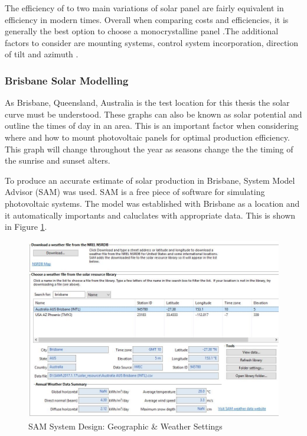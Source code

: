 The efficiency of to two main variations of solar panel are fairly equivalent in efficiency in modern times. Overall when comparing costs and efficiencies, it is generally the best option to choose a monocrystalline panel \cite{Haberlin2012}.The additional factors to consider are mounting systems, control system incorporation, direction of tilt and azimuth \cite{Haberlin2012}.  


\subsubsection{Brisbane Solar Modelling} \label{section:brisbane-pv-modelling}

As Brisbane, Queensland, Australia is the test location for this thesis the solar curve must be understood. These graphs can also be known as solar potential and outline the times of day in an area. This is an important factor when considering where and how to mount photovoltaic panels for optimal production efficiency. This graph will change throughout the year as seasons change the the timing of the sunrise and sunset alters. 
\newline

To produce an accurate estimate of solar production in Brisbane, System Model Advisor (SAM) was used. SAM is a free piece of software for simulating photovoltaic systems. The model was established with Brisbane as a location and it automatically importants and caluclates with appropriate data. This is shown in Figure \ref{fig:SAM-test1-weather}. 

\begin{figure}[H]
	\hfill\includegraphics[width = 120mm]{images/sam/test1-weather}\hspace*{\fill}
	\caption{SAM System Design: Geographic \& Weather Settings} 
	\label{fig:SAM-test1-weather}
\end{figure}

